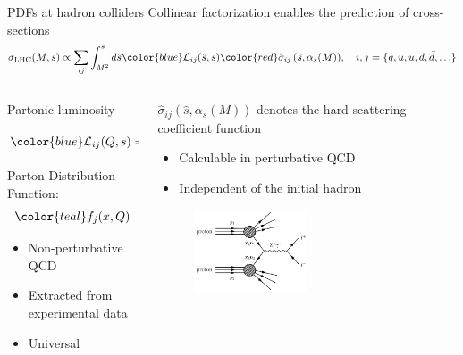 \documentclass[aspectratio=169, 8pt,t]{beamer}
\begin{document}
\begin{frame}{PDFs at hadron colliders}
  Collinear factorization enables the prediction of cross-sections
  \begin{equation*}
    \sigma_{\mathrm{LHC}}(M, s) \propto \sum_{i j} \int_{M^2}^s d \hat{s} {\color{blue}\mathcal{L}_{i j}(\hat{s}, s)} {\color{red}\hat{\sigma}_{i j}\left(\hat{s}, \alpha_s(M)\right)}, \quad i,j = \{g, u, \bar{u}, d, \bar{d}, \ldots\}
  \end{equation*}

  \begin{columns}
    \begin{column}{0.49\textwidth}
      Partonic luminosity
      \begin{equation*}
        {\color{blue}\mathcal{L}_{i j}(Q, s)}=\frac{1}{s} \int_{Q^2 / s}^1 \frac{d x}{x} {\color{teal}f_i\left(\frac{Q^2}{s x}, Q\right) f_j(x, Q)}
      \end{equation*}
      Parton Distribution Function:
      \begin{equation*}
        {\color{teal} f_j(x,Q)}
      \end{equation*}
      \begin{itemize}
        \item Non-perturbative QCD
        \item Extracted from experimental data
        \item Universal
      \end{itemize}
    \end{column}

    \begin{column}{0.49\textwidth}
      {\color{red} $\hat{\sigma}_{i j}\left(\hat{s}, \alpha_s(M)\right)$} denotes the hard-scattering coefficient function
      \begin{itemize}
        \item Calculable in perturbative QCD
        \item Independent of the initial hadron
      \end{itemize}
      \begin{figure}
        \includegraphics[width=0.5\textwidth]{figures/dy.png}
      \end{figure}
    \end{column}
  \end{columns}
\end{frame}
\end{document}

